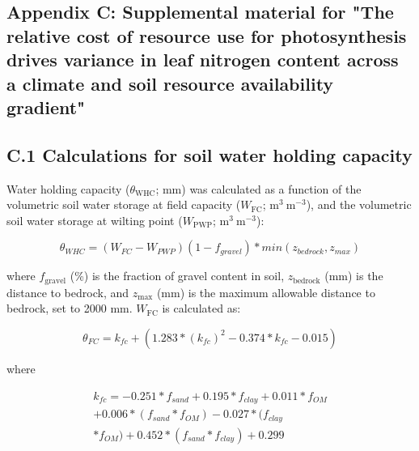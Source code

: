 \begin{singlespace}
    \chapter{\textbf{Appendix C: Supplemental material for "The relative cost of resource use for photosynthesis drives variance in leaf nitrogen content across a climate and soil resource availability gradient"}}
\end{singlespace}

\setcounter{table}{0}
\renewcommand{\thetable}{C\arabic{table}}

\setcounter{figure}{0}
\renewcommand{\thefigure}{C\arabic{figure}}


\section*{C.1 Calculations for soil water holding capacity}\label{appendix.c1}
\noindent Water holding capacity ($\theta_\mathrm{WHC}$; mm) was calculated as a function of the volumetric soil water storage at field capacity ($W_\mathrm{FC}$; $\mathrm{m^3\ m^{-3}}$), and the volumetric soil water storage at wilting point ($W_\mathrm{PWP}$; $\mathrm{m^3\ m^{-3}}$):

\begin{equation}
    \label{eqn_s4.1} \tag{C4.1}
    \theta_{WHC} = (W_{FC}-W_{PWP})(1-f_{gravel}) * min(z_{bedrock}, z_{max})
\end{equation}

\noindent where $f_\mathrm{gravel}$ (\%) is the fraction of gravel content in soil, $z_\mathrm{bedrock}$ (mm) is the distance to bedrock, and $z_\mathrm{max}$ (mm) is the maximum allowable distance to bedrock, set to 2000 mm. $W_\mathrm{FC}$ is calculated as:

\begin{equation}
    \label{eqn_s4.2} \tag{C4.2}
    \theta_{FC} = k_{fc}+(1.283*(k_{fc})^2-0.374*k_{fc}-0.015)
\end{equation}

\noindent where

\begin{equation}
    \label{eqn_s4.3} \tag{C4.3}
    \begin{aligned}
        k_{fc}= -0.251 * f_{sand} + 0.195 * f_{clay} + 0.011 * f_{OM} \\ + 0.006 * (f_{sand} * f_{OM}) - 0.027 * (f_{clay} \\ * f_{OM}) + 0.452 * (f_{sand} * f_{clay}) + 0.299
    \end{aligned}	
\end{equation}


